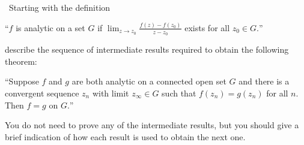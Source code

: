 \documentclass[12pt]{Qual}
\begin{document}
\begin{problem} $\,$
Starting with the definition

``$f$ is analytic on a set $G$ if $\lim_{z\to z_0}\frac{f(z)-f(z_0)}{z-z_0}$ exists for all $z_0\in G.$''

describe the sequence of intermediate results required to obtain the following theorem:

``Suppose $f$ and $g$ are both analytic on a connected open set $G$ and there is a convergent sequence $z_n$ with limit $z_\infty\in G$ such that $f(z_n)=g(z_n)$ for all $n.$ Then $f=g$ on $G.$''

You do not need to prove any of the intermediate results, but you should give a brief indication of how each result is used to obtain the next one.
\end{problem}
\end{document}
